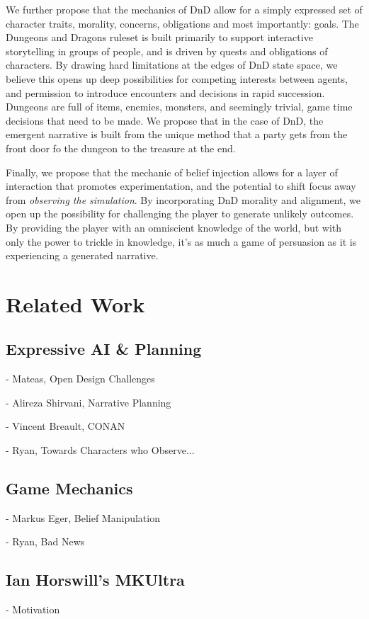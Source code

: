 \documentclass[letterpaper, 10 pt, conference]{ieeeconf}  %
\begin{document}
 We further propose that the mechanics of DnD allow for a simply expressed set of character traits, morality, concerns, obligations and most importantly: goals. The Dungeons and Dragons ruleset is built primarily to support interactive storytelling in groups of people, and is driven by quests and obligations of characters. By drawing hard limitations at the edges of DnD state space, we believe this opens up deep possibilities for competing interests between agents, and permission to introduce encounters and decisions in rapid succession. Dungeons are full of items, enemies, monsters, and seemingly trivial, game time decisions that need to be made. We propose that in the case of DnD, the emergent narrative is built from the unique method that a party gets from the front door fo the dungeon to the treasure at the end.
 
 Finally, we propose that the mechanic of belief injection allows for a layer of interaction that promotes experimentation, and the potential to shift focus away from \emph{observing the simulation}. By incorporating DnD morality and alignment, we open up the possibility for challenging the player to generate unlikely outcomes. By providing the player with an omniscient knowledge of the world, but with only the power to trickle in knowledge, it's as much a game of persuasion as it is experiencing a generated narrative.
 
  
\section{Related Work}
\subsection{Expressive AI \& Planning}
- Mateas, Open Design Challenges

- Alireza Shirvani, Narrative Planning

- Vincent Breault, CONAN

- Ryan, Towards Characters who Observe...

\subsection{Game Mechanics}
- Markus Eger, Belief Manipulation

- Ryan, Bad News

\subsection{Ian Horswill's MKUltra}
- Motivation
\end{document}
